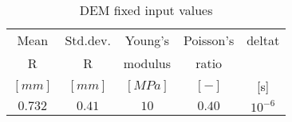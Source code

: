 \begin{table}[h]
\centering
\begin{tabular}{ccccc}
\hline
    Mean & Std.dev.  & Young's & Poisson's & \ac{deltat}\\
    \ac{R} & \ac{R} & modulus & ratio & \\
    $[mm]$  & $[mm]$  & $[MPa]$ & $[-]$ & [s]\\
    \hline
    $0.732$ & $0.41$ & $10$    & $0.40$ & $10^{-6}$\\


\hline
\end{tabular}
\caption{DEM fixed input values}
\label{tab:09DEMFixedinputvalues}
\end{table}